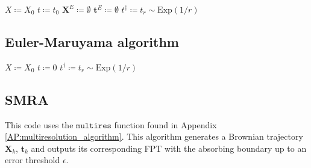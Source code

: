 \documentclass[preprint,12pt]{elsarticle}
\numberwithin{equation}{section}
\theoremstyle{plain} \newtheorem{theorem}{Theorem}[section]
\theoremstyle{plain} \newtheorem{proposition}[theorem]{Proposition}
\theoremstyle{plain} \newtheorem{lemma}[theorem]{Lemma}
\theoremstyle{plain} \newtheorem{corollary}[theorem]{Corollary}
\theoremstyle{definition} \newtheorem{definition}[theorem]{Definition}
\theoremstyle{definition} \newtheorem{notation}[theorem]{Notation}
\theoremstyle{remark} \newtheorem{remark}[theorem]{Remark}
\theoremstyle{remark} \newtheorem{remarks}[theorem]{Remarks}
\theoremstyle{remark} \newtheorem{algorithm2}[theorem]{Algorithm}
\theoremstyle{remark} \newtheorem{example}[theorem]{Example}
\begin{document}
\begin{appendices}
\begin{algorithm}[H]
\caption{\texttt{euler}: Generate Euler trajectory below threshold $\lambda$}
\LinesNumbered
{}
$X \coloneqq X_0$ \;
$t \coloneqq t_0$ \;
$\mathbf{X}^E \coloneqq \emptyset$ \;
$\mathbf{t}^E \coloneqq \emptyset$ \;
$t^\dag \coloneqq t_r \sim \mathrm{Exp}(1/r)$ \;
\end{algorithm}

\newpage
\subsection{Euler-Maruyama algorithm}
\begin{algorithm}[!htb]
\caption{Euler-Maruyama algorithm for FPT} \label{alg:eulermaruyama}
$X \coloneqq X_0$\;
$t \coloneqq 0$ \;
$t^\dag \coloneqq t_r \sim \mathrm{Exp}(1/r)$ \;
\end{algorithm}

\newpage
\subsection{SMRA}
\label{sec:appendix3}

This code uses the $\texttt{multires}$ function found in Appendix \ref{AP:multiresolution_algorithm}. This algorithm generates a Brownian trajectory $\mathbf{X}_k$, $\mathbf{t}_k$ and outputs its corresponding FPT with the absorbing boundary up to an error threshold $\epsilon$.


\end{appendices}
\end{document}
